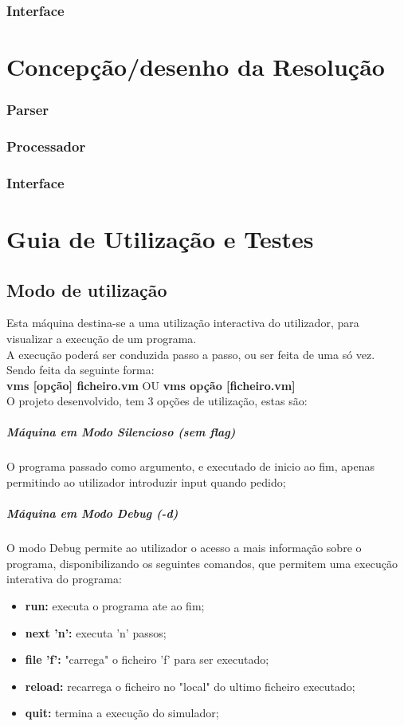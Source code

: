 \documentclass{report}
\begin{document}
\subsection{Interface}

\chapter{Concepção/desenho da Resolução}
\subsection{Parser}
\subsection{Processador}
\subsection{Interface}

\chapter{Guia de Utilização e Testes}
\section{Modo de utilização}
\quad Esta máquina destina-se a uma utilização interactiva do utilizador, para visualizar a execução de um programa.\\
A execução poderá ser conduzida passo a passo, ou ser feita de uma só vez.\\
Sendo feita da seguinte forma:\\

\quad \textbf{vms [opção] ficheiro.vm} OU \textbf{vms opção [ficheiro.vm]}\\

O projeto desenvolvido, tem 3 opções de utilização, estas são:
\paragraph{\quad Máquina em Modo Silencioso (sem flag)}
	O programa passado como argumento, e executado de inicio ao fim, apenas permitindo ao utilizador introduzir input quando pedido;
\paragraph{\quad Máquina em Modo Debug (-d)}
	O modo Debug permite ao utilizador o acesso a mais informação sobre o programa, disponibilizando
  os seguintes comandos, que permitem uma execução interativa do programa:
\begin{itemize}
	\item \textbf{run:} executa o programa ate ao fim;
	\item \textbf{next 'n':} executa 'n' passos;
	\item \textbf{file 'f':} "carrega" o ficheiro 'f' para ser executado;
	\item \textbf{reload:} recarrega o ficheiro no "local" do ultimo ficheiro executado;
	\item \textbf{quit:} termina a execução do simulador;
\end{itemize}
\end{document}
